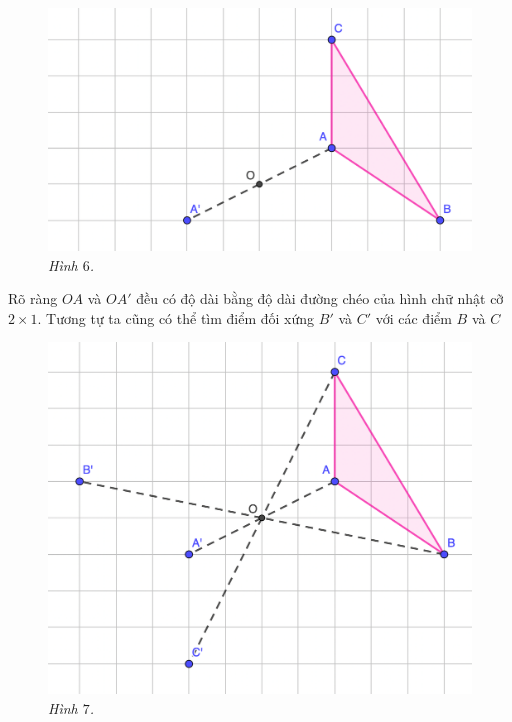 \begin{multicols}{2}
	\begin{figure}[H]
		\vspace*{-5pt}
		\centering
		\captionsetup{labelformat= empty, justification=centering}
		\includegraphics[width= 1\linewidth]{6}
		\caption{\small\textit{\color{toancuabi}Hình $6$.}}
		\vspace*{-10pt}
	\end{figure}
	Rõ ràng $OA$ và $OA'$ đều có độ dài bằng độ dài đường chéo của hình chữ nhật cỡ $2\times 1$.
	\vskip 0.1cm
	Tương tự ta cũng có thể tìm điểm đối xứng $B'$ và $C'$ với các điểm $B$ và $C$
	\begin{figure}[H]
		\vspace*{5pt}
		\centering
		\captionsetup{labelformat= empty, justification=centering}
		\includegraphics[width= 1\linewidth]{7}
		\caption{\small\textit{\color{toancuabi}Hình $7$.}}

\end{figure}
\end{multicols}
